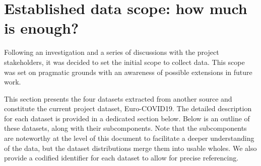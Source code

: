 \section{Established data scope: how much is enough?}

Following an investigation and a series of discussions with the project stakeholders, it was decided to set the initial scope to collect data. This scope was set on pragmatic grounds with an awareness of possible extensions in future work.

This section presents the four datasets extracted from another source and constitute the current project dataset, Euro-COVID19. The detailed description for each dataset is provided in a dedicated section below. Below is an outline of these datasets, along with their subcomponents. Note that the subcomponents are noteworthy at the level of this document to facilitate a deeper understanding of the data, but the dataset distributions merge them into usable wholes. We also provide a codified identifier for each dataset to allow for precise referencing. 

